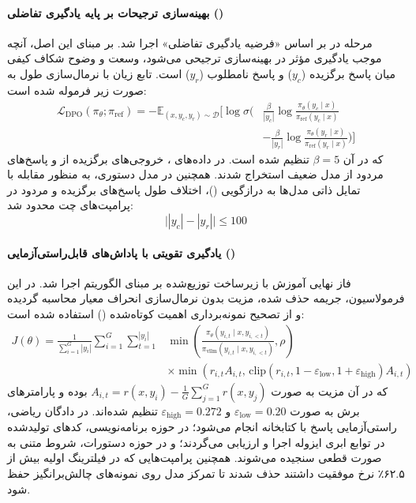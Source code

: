 \paragraph*{بهینه‌سازی ترجیحات بر پایه یادگیری تفاضلی ()}
مرحله  در  بر اساس «فرضیه یادگیری تفاضلی» \cite{geng2025delta} اجرا شد. بر مبنای این اصل، آنچه موجب یادگیری مؤثر در بهینه‌سازی ترجیحی می‌شود، وسعت و وضوح شکاف کیفی میان پاسخ برگزیده ($y_c$) و پاسخ نامطلوب ($y_r$) است. تابع زیان با نرمال‌سازی طول به صورت زیر فرموله شده است:
\begin{equation}
\begin{aligned}
    \mathcal{L}_{\text{DPO}}(\pi_\theta; \pi_{\text{ref}}) = - \mathbb{E}_{(x, y_c, y_r) \sim \mathcal{D}} \Bigg[ \log \sigma \Bigg( 
    &\frac{\beta}{|y_c|} \log \frac{\pi_\theta(y_c \mid x)}{\pi_{\text{ref}}(y_c \mid x)} \\
    &- \frac{\beta}{|y_r|} \log \frac{\pi_\theta(y_r \mid x)}{\pi_{\text{ref}}(y_r \mid x)} \Bigg) \Bigg]
\end{aligned}
\end{equation}
که در آن $\beta = 5$ تنظیم شده است. در داده‌های ، خروجی‌های برگزیده از  و پاسخ‌های مردود از مدل ضعیف  استخراج شدند. همچنین در مدل دستوری، به منظور مقابله با تمایل ذاتی مدل‌ها به درازگویی ()، اختلاف طول پاسخ‌های برگزیده و مردود در پرامپت‌های چت محدود شد:
\begin{equation}
    \big| |y_c| - |y_r| \big| \le 100
\end{equation}

\paragraph*{یادگیری تقویتی با پاداش‌های قابل‌راستی‌آزمایی ()}
فاز نهایی آموزش با زیرساخت توزیع‌شده  بر مبنای الگوریتم  \cite{shao2024deepseekmath} اجرا شد. در این فرمولاسیون، جریمه  حذف شده، مزیت بدون نرمال‌سازی انحراف معیار محاسبه گردیده و از تصحیح نمونه‌برداری اهمیت کوتاه‌شده () \cite{yao2025offpolicy} استفاده شده است:
\begin{equation}
\begin{aligned}
    J(\theta) = \frac{1}{\sum_{i=1}^G |y_i|} \sum_{i=1}^G \sum_{t=1}^{|y_i|} 
    &\min \left( \frac{\pi_\theta(y_{i,t} \mid x, y_{i,<t})}{\pi_{\text{vllm}}(y_{i,t} \mid x, y_{i,<t})}, \rho \right) \\
    &\times \min \left( r_{i,t} A_{i,t}, \, \text{clip}(r_{i,t}, 1-\varepsilon_{\text{low}}, 1+\varepsilon_{\text{high}}) A_{i,t} \right)
\end{aligned}
\end{equation}
که در آن مزیت به صورت $A_{i,t} = r(x, y_i) - \frac{1}{G} \sum_{j=1}^G r(x, y_j)$ بوده و پارامترهای برش به صورت $\varepsilon_{\text{low}} = 0.20$ و $\varepsilon_{\text{high}} = 0.272$ تنظیم شده‌اند. در دادگان ریاضی، راستی‌آزمایی پاسخ با کتابخانه  انجام می‌شود؛ در حوزه برنامه‌نویسی، کدهای تولیدشده در توابع ابری ایزوله  اجرا و ارزیابی می‌گردند؛ و در حوزه دستورات، شروط متنی به صورت قطعی سنجیده می‌شوند. همچنین پرامپت‌هایی که در فیلترینگ اولیه بیش از ۶۲.۵٪ نرخ موفقیت داشتند حذف شدند تا تمرکز مدل روی نمونه‌های چالش‌برانگیز حفظ شود.

